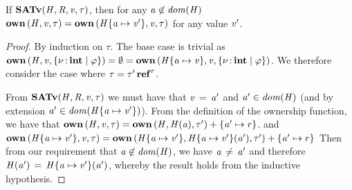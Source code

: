 \begin{lemma}
  \label{lem:ownaddheap}
  If $ \mathbf{SATv} ( \mathit{H} , \mathit{R} , \mathit{v} , \tau ) $, then for any $ \mathit{a}  \not\in   \mathit{dom}( \mathit{H} )  $
  $\mathbf{own} \, (  \mathit{H}  ,  \mathit{v}  ,  \tau  )  =  \mathbf{own} \, (  \mathit{H}  \{  \mathit{a}  \mapsto  \mathit{v'}  \}  ,  \mathit{v}  ,  \tau  )$ for any value $\mathit{v'}$.
\end{lemma}
\begin{proof}
  By induction on $\tau$. The base case is trivial as $\mathbf{own} \, (  \mathit{H}  ,  \mathit{v}  ,   \left\{{  \nu  \operatorname{:} \mathbf{int} \mid  \varphi }\right\}   )  =   \emptyset   =  \mathbf{own} \, (  \mathit{H}  \{  \mathit{a}  \mapsto  \mathit{v}  \}  ,  \mathit{v}  ,   \left\{{  \nu  \operatorname{:} \mathbf{int} \mid  \varphi }\right\}   )$.
  We therefore consider the case where $\tau  =   \tau'  \operatorname{\mathbf{ref}}^{ r } $.

  From $ \mathbf{SATv} ( \mathit{H} , \mathit{R} , \mathit{v} , \tau ) $ we must have that $\mathit{v} \, = \, \mathit{a'}$ and
  $ \mathit{a'}  \in   \mathit{dom}( \mathit{H} )  $ (and by extension $ \mathit{a'}  \in   \mathit{dom}( \mathit{H}  \{  \mathit{a}  \mapsto  \mathit{v'}  \} )  $).
  From the definition of the ownership function, we have that $\mathbf{own} \, (  \mathit{H}  ,  \mathit{v}  ,  \tau  )  =  \mathbf{own} \, (  \mathit{H}  ,  \mathit{H}  (  \mathit{a}  )  ,  \tau'  )  +  \{  \mathit{a'}  \mapsto  r  \}$.
  and $\mathbf{own} \, (  \mathit{H}  \{  \mathit{a}  \mapsto  \mathit{v'}  \}  ,  \mathit{v}  ,  \tau  )  =  \mathbf{own} \, (  \mathit{H}  \{  \mathit{a}  \mapsto  \mathit{v'}  \}  ,  \mathit{H}  \{  \mathit{a}  \mapsto  \mathit{v'}  \}  (  \mathit{a'}  )  ,  \tau'  )  +  \{  \mathit{a'}  \mapsto  r  \}$
  Then from our requirement that  $ \mathit{a}  \not\in   \mathit{dom}( \mathit{H} )  $, we have $\mathit{a} \, \neq \, \mathit{a'}$ and therefore
  $\mathit{H}  (  \mathit{a'}  ) \, = \, \mathit{H}  \{  \mathit{a}  \mapsto  \mathit{v'}  \}  (  \mathit{a'}  )$, whereby the result holds from the inductive hypothesis.
\end{proof}

